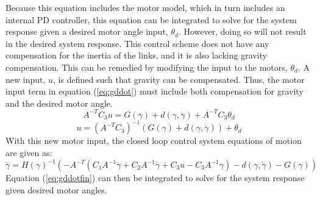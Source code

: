 Because this equation includes the motor model, which in turn includes an internal PD controller, this equation can be integrated to solve for the system response given a desired motor angle input, $\theta_d$. However, doing so will not result in the desired system response. This control scheme does not have any compensation for the inertia of the links, and it is also lacking gravity compensation. This can be remedied by modifying the input to the motors, $\theta_d$. A new input, $u$, is defined such that gravity can be compensated. Thus, the motor input term in equation (\ref{eq:gddot}) must include both compensation for gravity and the desired motor angle.
\[
A^{-T} C_3  u=G(\gamma)+d(\gamma, \dot{\gamma})+A^{-T} C_3\theta_{d}
\]
\begin{equation}
u=\left(A^{-T} C_3\right)^{-1} \left(G(\gamma)+d(\gamma, \dot{\gamma})\right) + \theta_{d}
\end{equation}
With this new motor input, the closed loop control system equations of motion are given as:
\begin{equation}
\ddot{\gamma}=H(\gamma)^{-1}\left(-A^{-T}\left(C_1 A^{-1} \ddot{\gamma}+C_2 A^{-1} \dot{\gamma}+C_3 u-C_3A^{-1} \gamma\right)-d(\gamma, \dot{\gamma})-G(\gamma)\right)
\label{eq:gddotfin}
\end{equation}
Equation (\ref{eq:gddotfin}) can then be integrated to solve for the system response given desired motor angles.

